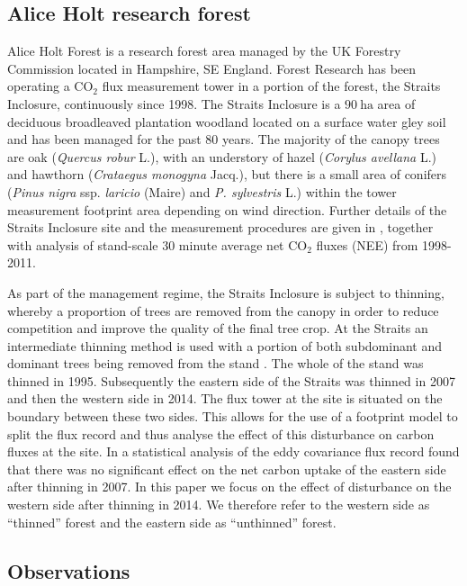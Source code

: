 \subsection{Alice Holt research forest} \label{chap7:sec:site_description}

Alice Holt Forest is a research forest area managed by the UK Forestry Commission located in Hampshire, SE England. Forest Research has been operating a $\text{CO}_{2}$ flux measurement tower in a portion of the forest, the Straits Inclosure, continuously since 1998. The Straits Inclosure is a $90~\text{ha}$ area of deciduous broadleaved plantation woodland located on a surface water gley soil and has been managed for the past 80 years. The majority of the canopy trees are oak (\textit{Quercus robur} L.), with an understory of hazel (\textit{Corylus avellana} L.) and hawthorn (\textit{Crataegus monogyna} Jacq.), but there is a small area of conifers (\textit{Pinus nigra} ssp. \textit{laricio} (Maire) and \textit{P. sylvestris} L.) within the tower measurement footprint area depending on wind direction. Further details of the Straits Inclosure site and the measurement procedures are given in \citet{wilkinson2012inter}, together with analysis of stand-scale $30$ minute average net $\text{CO}_{2}$ fluxes (NEE) from 1998-2011. 

As part of the management regime, the Straits Inclosure is subject to thinning, whereby a proportion of trees are removed from the canopy in order to reduce competition and improve the quality of the final tree crop. At the Straits an intermediate thinning method is used with a portion of both subdominant and dominant trees being removed from the stand \citep{kerr2011thinning}. The whole of the stand was thinned in 1995. Subsequently the eastern side of the Straits was thinned in 2007 and then the western side in 2014. The flux tower at the site is situated on the boundary between these two sides. This allows for the use of a footprint model to split the flux record and thus analyse the effect of this disturbance on carbon fluxes at the site. In \citet{wilkinson2015effects} a statistical analysis of the eddy covariance flux record found that there was no significant effect on the net carbon uptake of the eastern side after thinning in 2007. In this paper we focus on the effect of disturbance on the western side after thinning in 2014. We therefore refer to the western side as ``thinned'' forest and the eastern side as ``unthinned'' forest.   

\subsection{Observations} \label{chap7:sec:obs}

